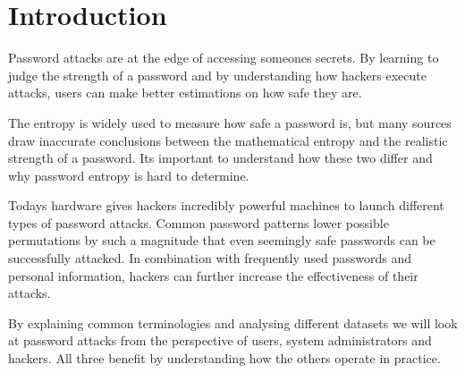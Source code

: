 \section{Introduction}

Password attacks are at the edge of accessing someones secrets. By learning to judge the strength of a password and by understanding how hackers execute attacks, users can make better estimations on how safe they are.

The entropy is widely used to measure how safe a password is, but many sources draw inaccurate conclusions between the mathematical entropy and the realistic strength of a password. Its important to understand how these two differ and why password entropy is hard to determine.

Todays hardware gives hackers incredibly powerful machines to launch different types of password attacks. Common password patterns lower possible permutations by such a magnitude that even seemingly safe passwords can be successfully attacked. In combination with frequently used passwords and personal information, hackers can further increase the effectiveness of their attacks.

By explaining common terminologies and analysing different datasets we will look at password attacks from the perspective of users, system administrators and hackers. All three benefit by understanding how the others operate in practice.

\newpage